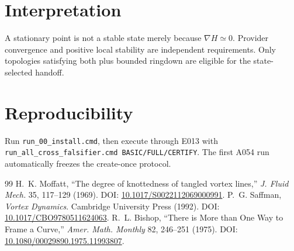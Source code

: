 \documentclass[11pt]{article}
\begin{document}
\section{Interpretation}
A stationary point is not a stable state merely because $\nabla H\simeq0$. Provider convergence and positive local stability are independent requirements. Only topologies satisfying both plus bounded ringdown are eligible for the state-selected handoff.
\section{Reproducibility}
Run \texttt{run\_00\_install.cmd}, then execute through E013 with \texttt{run\_all\_cross\_falsifier.cmd BASIC/FULL/CERTIFY}. The first A054 run automatically freezes the create-once protocol.
\begin{thebibliography}{99}
 H.~K. Moffatt, ``The degree of knottedness of tangled vortex lines,'' \emph{J. Fluid Mech.} 35, 117--129 (1969). DOI: \href{https://doi.org/10.1017/S0022112069000991}{10.1017/S0022112069000991}.
 P.~G. Saffman, \emph{Vortex Dynamics}. Cambridge University Press (1992). DOI: \href{https://doi.org/10.1017/CBO9780511624063}{10.1017/CBO9780511624063}.
 R.~L. Bishop, ``There is More than One Way to Frame a Curve,'' \emph{Amer. Math. Monthly} 82, 246--251 (1975). DOI: \href{https://doi.org/10.1080/00029890.1975.11993807}{10.1080/00029890.1975.11993807}.
\end{thebibliography}
\end{document}
